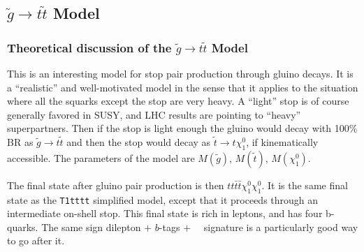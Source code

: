 


\subsection{$\widetilde{g} \to t\widetilde{t}$ Model}
\label{sec:firststopmodel}

\subsubsection{Theoretical discussion of the $\widetilde{g} \to t\widetilde{t}$ Model}
\label{sec:firststopmodeltheory}

This is an interesting model for stop pair production through gluino 
decays\cite{susyssbtags}\cite{susyssbtags2}\cite{wacker}\cite{naturalness4}.
It is a ``realistic'' and well-motivated 
model in the sense that it applies to the situation 
where all the squarks except the stop are very heavy.  A ``light'' stop is of course
generally favored in SUSY, and LHC results are pointing to ``heavy'' superpartners.
Then if the stop
is light enough the gluino would decay with 100\% BR as $\widetilde{g} \to t\widetilde{t}$
and then the stop would decay as $\widetilde{t} \to t \chi_1^0$, if kinematically 
accessible.
The parameters of the model are $M(\widetilde{g})$, $M(\widetilde{t})$, $M(\chi_1^0)$.

The final state after gluino pair production is then $tt\bar{t}\bar{t}\chi_1^0\chi_1^0$.
It is the same final state as the {\tt T1tttt} 
simplified model\cite{T1tttt}, except that 
it proceeds through an intermediate on-shell stop.  This final state is rich in leptons,
and has four b-quarks.  The same sign dilepton $+$ $b$-tags $+$ 
\met~~signature is a 
particularly good way to go after it.


